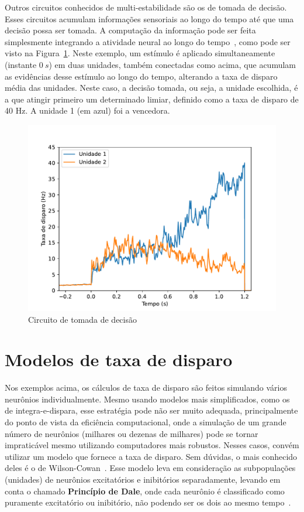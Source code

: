 Outros circuitos conhecidos de multi-estabilidade são os de tomada de decisão. Esses circuitos acumulam informações sensoriais ao longo do tempo até que uma decisão possa ser tomada. A computação da informação pode ser feita simplesmente integrando a atividade neural ao longo do tempo~\cite{cain_computational_2012}, como pode ser visto na Figura~\ref{fig:tomadadecisao}. Neste exemplo, um estímulo é aplicado simultaneamente (instante $0\ s$) em duas unidades, também conectadas como acima, que acumulam as evidências desse estímulo ao longo do tempo, alterando a taxa de disparo média das unidades. Neste caso, a decisão tomada, ou seja, a unidade escolhida, é a que atingir primeiro um determinado limiar, definido como a taxa de disparo de 40 Hz. A unidade 1 (em azul) foi a vencedora.
\begin{figure}[tb]
	\centering
	\caption[Circuito de tomada de decisão]{Circuito de tomada de decisão}
	\label{fig:tomadadecisao}
	\includegraphics[width=0.7\linewidth]{figs/tomada_decisao}
\end{figure}

\section{Modelos de taxa de disparo}\label{sec:modelostaxa}
Nos exemplos acima, os cálculos de taxa de disparo são feitos simulando vários neurônios individualmente. Mesmo usando modelos mais simplificados, como os de integra-e-dispara, esse estratégia pode não ser muito adequada, principalmente do ponto de vista da eficiência computacional, onde a simulação de um grande número de neurônios (milhares ou dezenas de milhares) pode se tornar impraticável mesmo utilizando computadores mais robustos. Nesses casos, convém utilizar um modelo que fornece a taxa de disparo. Sem dúvidas, o mais conhecido deles é o de Wilson-Cowan~\cite{wilson_excitatory_1972}. Esse modelo leva em consideração as subpopulações (unidades) de neurônios excitatórios e inibitórios separadamente, levando em conta o chamado \textbf{Princípio de Dale}, onde cada neurônio é classificado como puramente excitatório ou inibitório, não podendo ser os dois ao mesmo tempo~\cite{dale_pharmacology_1935}.

